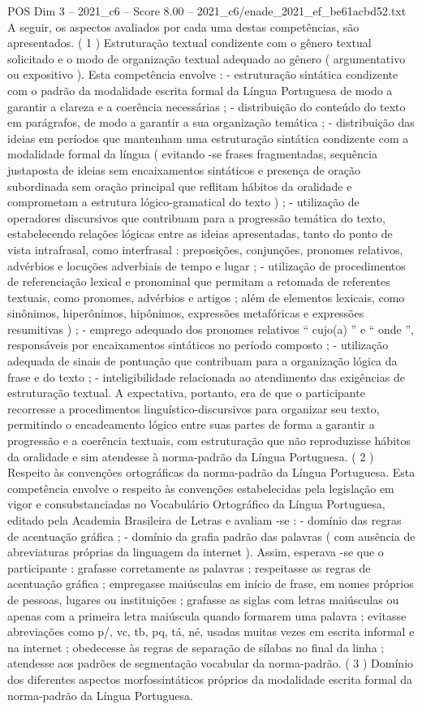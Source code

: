 \begin{textsample}{POS Dim 3 – 2021\_c6 – Score 8.00 – 2021\_c6/enade\_2021\_ef\_be61acbd52.txt}
A seguir, os aspectos avaliados por cada uma destas competências, são apresentados. ( 1 ) Estruturação textual condizente com o gênero textual solicitado e o modo de organização textual adequado ao gênero ( argumentativo ou expositivo ).
Esta competência envolve : - estruturação sintática condizente com o padrão da modalidade escrita formal da Língua Portuguesa de modo a garantir a clareza e a coerência necessárias ; - distribuição do conteúdo do texto em parágrafos, de modo a garantir a sua organização temática ; - distribuição das ideias em períodos que mantenham uma estruturação sintática condizente com a modalidade formal da língua ( evitando -se frases fragmentadas, sequência justaposta de ideias sem encaixamentos sintáticos e presença de oração subordinada sem oração principal que reflitam hábitos da oralidade e comprometam a estrutura lógico-gramatical do texto ) ; - utilização de operadores discursivos que contribuam para a progressão temática do texto, estabelecendo relações lógicas entre as ideias apresentadas, tanto do ponto de vista intrafrasal, como interfrasal : preposições, conjunções, pronomes relativos, advérbios e locuções adverbiais de tempo e lugar ; - utilização de procedimentos de referenciação lexical e pronominal que permitam a retomada de referentes textuais, como pronomes, advérbios e artigos ; além de elementos lexicais, como sinônimos, hiperônimos, hipônimos, expressões metafóricas e expressões resumitivas ) ; - emprego adequado dos pronomes relativos “ cujo(a) ” e “ onde ”, responsáveis por encaixamentos sintáticos no período composto ; - utilização adequada de sinais de pontuação que contribuam para a organização lógica da frase e do texto ; - inteligibilidade relacionada ao atendimento das exigências de estruturação textual.
A expectativa, portanto, era de que o participante recorresse a procedimentos linguístico-discursivos para organizar seu texto, permitindo o encadeamento lógico entre suas partes de forma a garantir a progressão e a coerência textuais, com estruturação que não reproduzisse hábitos da oralidade e sim atendesse à norma-padrão da Língua Portuguesa. ( 2 ) Respeito às convenções ortográficas da norma-padrão da Língua Portuguesa.
Esta competência envolve o respeito às convenções estabelecidas pela legislação em vigor e consubstanciadas no Vocabulário Ortográfico da Língua Portuguesa, editado pela Academia Brasileira de Letras e avaliam -se : - domínio das regras de acentuação gráfica ; - domínio da grafia padrão das palavras ( com ausência de abreviaturas próprias da linguagem da internet ).
Assim, esperava -se que o participante : grafasse corretamente as palavras ; respeitasse as regras de acentuação gráfica ; empregasse maiúsculas em início de frase, em nomes próprios de pessoas, lugares ou instituições ; grafasse as siglas com letras maiúsculas ou apenas com a primeira letra maiúscula quando formarem uma palavra ; evitasse abreviações como p/, vc, tb, pq, tá, né, usadas muitas vezes em escrita informal e na internet ; obedecesse às regras de separação de sílabas no final da linha ; atendesse aos padrões de segmentação vocabular da norma-padrão. ( 3 ) Domínio dos diferentes aspectos morfossintáticos próprios da modalidade escrita formal da norma-padrão da Língua Portuguesa.

\end{textsample}
